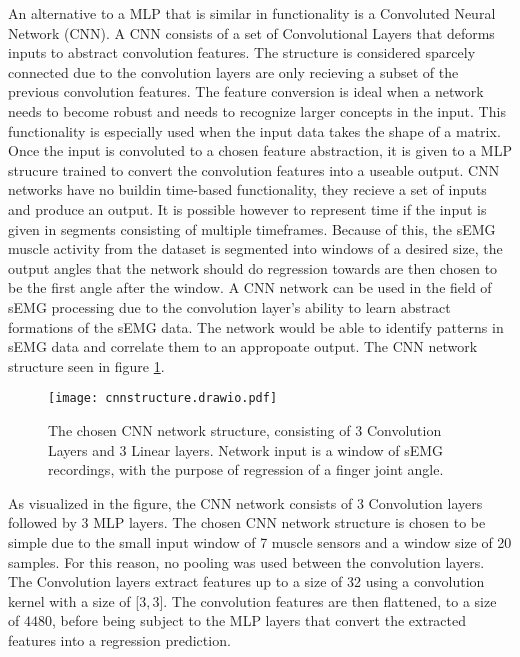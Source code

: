 \documentclass[../main.tex]{subfiles}
\begin{document}

An alternative to a MLP that is similar in functionality is a Convoluted Neural Network (CNN).
A CNN consists of a set of Convolutional Layers that deforms inputs to abstract convolution features.
The structure is considered sparcely connected due to the convolution layers are only recieving a subset of the previous convolution features.
The feature conversion is ideal when a network needs to become robust and needs to recognize larger concepts in the input.
This functionality is especially used when the input data takes the shape of a matrix.
Once the input is convoluted to a chosen feature abstraction, it is given to a MLP strucure trained to convert the convolution features into a useable output.
CNN networks have no buildin time-based functionality, they recieve a set of inputs and produce an output.
It is possible however to represent time if the input is given in segments consisting of multiple timeframes.
Because of this, the sEMG muscle activity from the dataset is segmented into windows of a desired size, the output angles that the network should do regression towards are then chosen to be the first angle after the window.
A CNN network can be used in the field of sEMG processing due to the convolution layer's ability to learn abstract formations of the sEMG data.
The network would be able to identify patterns in sEMG data and correlate them to an appropoate output.
The CNN network structure seen in figure \ref{fig:cnn_structure}.

\begin{figure}[h]
\begin{center}
\texttt{[image: cnnstructure.drawio.pdf]}
\caption{The chosen CNN network structure, consisting of 3 Convolution Layers and 3 Linear layers. Network input is a window of sEMG recordings, with the purpose of regression of a finger joint angle.}
\label{fig:cnn_structure}
\end{center}
\end{figure}

As visualized in the figure, the CNN network consists of 3 Convolution layers followed by 3 MLP layers.
The chosen CNN network structure is chosen to be simple due to the small input window of 7 muscle sensors and a window size of 20 samples.
For this reason, no pooling was used between the convolution layers.
The Convolution layers extract features up to a size of 32 using a convolution kernel with a size of [$3, 3$].
The convolution features are then flattened, to a size of $4480$, before being subject to the MLP layers that convert the extracted features into a regression prediction. 
\end{document}
